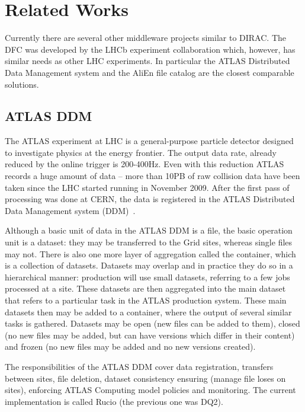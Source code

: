 \chapter{Related Works}
\label{chap:relwork}

Currently there are several other middleware projects similar to DIRAC. The DFC was developed by the LHCb experiment collaboration which, however, has similar needs as other LHC experiments. In particular the ATLAS
Distributed Data Management system and the AliEn file catalog are the closest comparable solutions.


\section{ATLAS DDM}
The ATLAS experiment at LHC is a general-purpose particle detector designed to investigate physics at the energy
frontier. The output data rate, already reduced by the online trigger is  200-400Hz. Even with this reduction 
ATLAS records a huge amount of data – more than 10PB of raw collision data have been taken since the LHC
started running in November 2009. After the first pass of processing was done at CERN, the data is registered in 
the ATLAS Distributed Data Management system (DDM)~\cite{ATLASDDM1}.	

Although a basic unit of data in the ATLAS DDM is a file, the basic operation unit is a dataset: they may be
transferred to the Grid sites, whereas single files may not. There is also one more layer of aggregation called 
the container, which is a collection of datasets. Datasets may overlap and in practice they do so in a 
hierarchical manner: production will use small datasets, referring to a few jobs processed at a site. These 
datasets are then aggregated into the main dataset that refers to a particular task in the ATLAS
production system. These main datasets then may be added to a container, where the output of several 
similar tasks is gathered. Datasets may be open (new files can be added to them), closed (no new files
may be added, but can have versions which differ in their content) and frozen (no new files may be added 
and no new versions created). 

The responsibilities of the ATLAS DDM cover data registration, transfers between sites, file deletion, dataset 
consistency ensuring (manage file loses on sites), enforcing ATLAS Computing model policies and monitoring. The
current implementation is called Rucio (the previous one was DQ2).


